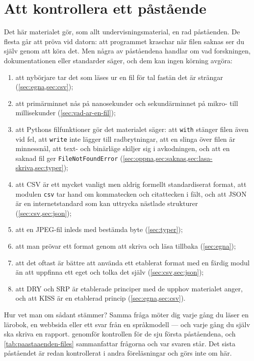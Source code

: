 \chapter{Att kontrollera ett påstående}
\label{app:verifiera-filer}

Det här materialet gör, som allt undervisningsmaterial, en rad
påståenden.  De flesta går att pröva vid datorn: att programmet kraschar
när filen saknas ser du själv genom att köra det.  Men några av
påståendena handlar om vad forskningen, dokumentationen eller standarder
säger, och dem kan ingen körning avgöra:
\begin{enumerate}
  \item att nybörjare tar det som läses ur en fil för tal fastän det är
    strängar
    (\cref{sec:egna,sec:csv});
  \item att primärminnet nås på nanosekunder och sekundärminnet på
    mikro- till millisekunder (\cref{sec:vad-ar-en-fil});
  \item att Pythons filfunktioner gör det materialet säger: att
    \texttt{with} stänger filen även vid fel, att
    \texttt{write} inte lägger till radbrytningar, att en
    slinga över filen är minnessnål, att text- och binärläge skiljer sig
    i avkodningen, och att en saknad fil ger
    \texttt{FileNotFoundError}
    (\cref{sec:oppna,sec:saknas,sec:lasa-skriva,sec:typer});
  \item att CSV är ett mycket vanligt men aldrig formellt standardiserat
    format, att modulen \texttt{csv} tar hand om kommatecken
    och citattecken i fält, och att JSON är en internetstandard som kan
    uttrycka nästlade strukturer (\cref{sec:csv,sec:json});
  \item att en JPEG-fil inleds med bestämda byte (\cref{sec:typer});
  \item att man prövar ett format genom att skriva och läsa tillbaka
    (\cref{sec:egna});
  \item att det oftast är bättre att använda ett etablerat format med en
    färdig modul än att uppfinna ett eget och tolka det själv
    (\cref{sec:csv,sec:json});
  \item att DRY och SRP är etablerade principer med de upphov materialet
    anger, och att KISS är en etablerad princip (\cref{sec:egna,sec:csv}).
\end{enumerate}
Hur vet man om sådant stämmer?  Samma fråga möter dig varje gång du läser
en lärobok, en webbsida eller ett svar från en språkmodell --- och varje
gång du själv ska skriva en rapport.
 genomför kontrollen
för de sju första påståendena, och \cref{tab:paastaaenden-files}
sammanfattar frågorna och var svaren står.  Det sista påståendet är
redan kontrollerat i andra föreläsningar och görs inte om här.

